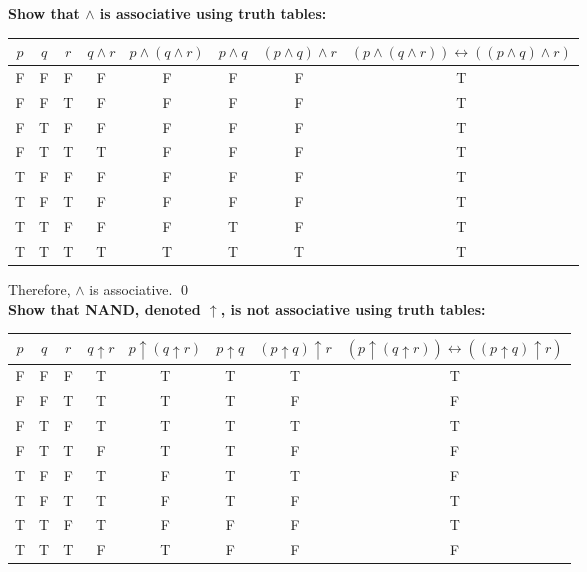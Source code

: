 \documentclass[letterpaper, 12pt]{article}
\begin{document}
\noindent\textbf{Show that $\land$ is associative using truth tables:}

\begin{tabular}{c|c|c||c|c|c|c|c}
    $p$ &   $q$ &   $r$ &   $q\land r$    &   $p \land (q\land r)$  &   $p\land q$  &   $(p\land q) \land r$  &   $(p \land (q\land r)) \leftrightarrow ((p\land q) \land r)$ \\ \hline
    F   &   F   &   F   &   F   &   F   &   F   &   F   &   T   \\
    F   &   F   &   T   &   F   &   F   &   F   &   F   &   T   \\
    F   &   T   &   F   &   F   &   F   &   F   &   F   &   T   \\
    F   &   T   &   T   &   T   &   F   &   F   &   F   &   T   \\
    T   &   F   &   F   &   F   &   F   &   F   &   F   &   T   \\
    T   &   F   &   T   &   F   &   F   &   F   &   F   &   T   \\
    T   &   T   &   F   &   F   &   F   &   T   &   F   &   T   \\
    T   &   T   &   T   &   T   &   T   &   T   &   T   &   T   
\end{tabular}

Therefore, $\land$ is associative. \qed\\

\noindent\textbf{Show that NAND, denoted $\uparrow$, is not associative using truth tables:}

\begin{tabular}{c|c|c||c|c|c|c|c}
    $p$ &   $q$ &   $r$ &   $q\uparrow r$    &   $p \uparrow (q\uparrow r)$  &   $p\uparrow q$  &   $(p\uparrow q) \uparrow r$  &   $(p \uparrow (q\uparrow r)) \leftrightarrow ((p\uparrow q) \uparrow r)$ \\ \hline
    F   &   F   &   F   &   T   &   T   &   T   &   T   &   T   \\
    F   &   F   &   T   &   T   &   T   &   T   &   F   &   F   \\
    F   &   T   &   F   &   T   &   T   &   T   &   T   &   T   \\
    F   &   T   &   T   &   F   &   T   &   T   &   F   &   F   \\
    T   &   F   &   F   &   T   &   F   &   T   &   T   &   F   \\
    T   &   F   &   T   &   T   &   F   &   T   &   F   &   T   \\
    T   &   T   &   F   &   T   &   F   &   F   &   F   &   T   \\
    T   &   T   &   T   &   F   &   T   &   F   &   F   &   F   
\end{tabular}
\end{document}
